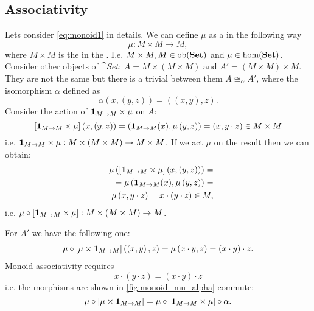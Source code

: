 \subsection{Associativity}
Lets consider \eqref{eq:monoid1} in details. 
We can define $\mu$ as a
 in the following way 
\[
\mu: M\times M \to M,
\]
where $M \times M$ is the  in the
. I.e. $M \times M, M \in \mathrm{ob}(\mathbf{Set})$ and
$\mu \in \mathrm{hom}(\mathbf{Set})$.  Consider other objects of $\cat{Set}$: $A =
M \times \left( M \times M \right)$ and $A' = \left( M \times M \right)
\times M$. They are not the same but there is a trivial
 between them $A \cong_\alpha A'$, where
the isomorphism $\alpha$ defined as
\[
\alpha(x,(y,z)) = ((x,y),z).
\]
Consider the action of  
$\mathbf{1}_{ M \to M } \times \mu$ on $A$:
\[
\left[\mathbf{1}_{ M \to M } \times \mu \right]\left(x,\left(y,z\right)\right) = 
\left(\mathbf{1}_{ M \to M }(x),\mu\left(y,z\right)\right) = 
\left(x, y \cdot z\right) \in M \times M
\]
i.e. $\mathbf{1}_{ M \to M } \times \mu: M \times \left( M \times M \right) \to M
\times M$. If we act $\mu$ on the result then we can obtain:
\begin{eqnarray}
\mu \left(\left[\mathbf{1}_{ M \to M } \times \mu
  \right]\left(x,\left(y,z\right)\right)\right) = 
\nonumber \\
=
\mu \left(\mathbf{1}_{ M \to M }(x),\mu\left(y,z\right)\right) = 
\nonumber \\
=
\mu\left(x, y \cdot z\right) = x \cdot (y\cdot z) \in M,
\nonumber
\end{eqnarray}
i.e. 
$\mu \circ \left[\mathbf{1}_{ M \to M } \times \mu\right]: M \times \left( M \times M
\right) \to M$.

For $A'$ we have the following one:
\begin{eqnarray}
\mu\circ\left[\mu \times \mathbf{1}_{ M \to M }\right]\left(\left(x,y\right),z\right)
= \mu\left(x \cdot y, z\right) = (x \cdot y) \cdot z.
\nonumber
\end{eqnarray}
Monoid associativity requires 
\[
x \cdot (y\cdot z) = 
(x \cdot y) \cdot z
\]
i.e. the morphisms are shown in \cref{fig:monoid_mu_alpha} commute:
\begin{equation}
\label{eq:monad_monoid_mu}
\mu\circ\left[\mu \times \mathbf{1}_{ M \to M }\right] =
\mu \circ \left[\mathbf{1}_{ M \to M } \times \mu\right] \circ \alpha.
\end{equation}

